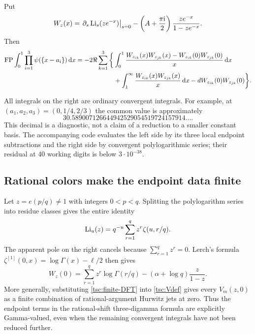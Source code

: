 \begin{corollary}\label{tsc:psi-mellin}
Put
\[
 W_z(x)=\left.\partial_s\operatorname{Li}_s(ze^{-x})\right|_{s=0}
            -\left(A+\frac{\pi\mathrm i}{2}\right)\frac{ze^{-x}}{1-ze^{-x}}.
\]
Then
\begin{align}\label{tsc:psi-integrals}
 \operatorname{FP}\int_0^1\prod_{i=1}^3\psi(\{x-a_i\})\,\mathrm d x
 =-2\Re\sum_{k=1}^3\bigg\{&
  \int_0^1\frac{W_{z_{ik}}(x)W_{z_{jk}}(x)
                 -W_{z_{ik}}(0)W_{z_{jk}}(0)}x\,\mathrm d x\notag\\
 &+\int_1^\infty\frac{W_{z_{ik}}(x)W_{z_{jk}}(x)}x\,\mathrm d x
   -dW_{z_{ik}}(0)W_{z_{jk}}(0)\bigg\}.
\end{align}
\end{corollary}
All integrals on the right are ordinary convergent integrals. For example,
at $(a_1,a_2,a_3)=(0,1/4,2/3)$ the common value is approximately
\[
 30.589007126644942529054519724157914\ldots.
\]
This decimal is a diagnostic, not a claim of a reduction to a smaller
constant basis. The accompanying code evaluates the left side by its
three local endpoint subtractions and the right side by convergent
polylogarithmic series; their residual at 40 working digits is below
$3\cdot10^{-38}$.

\subsection{Rational colors make the endpoint data finite}
Let $z=e(p/q)\ne1$ with integers $0<p<q$. Splitting the polylogarithm
series into residue classes gives the entire identity
\begin{equation}\label{tsc:finite-DFT}
 \operatorname{Li}_u(z)=q^{-u}\sum_{r=1}^q z^r\zeta(u,r/q).
\end{equation}
The apparent pole on the right cancels because $\sum_{r=1}^qz^r=0$.
Lerch's formula $\zeta^{[1]}(0,x)=\log\Gamma(x)-\ell/2$ then gives
\begin{equation}\label{tsc:W-boundary}
 W_z(0)=\sum_{r=1}^qz^r\log\Gamma(r/q)
       -(\alpha+\log q)\frac{z}{1-z}.
\end{equation}
More generally, substituting \eqref{tsc:finite-DFT} into \eqref{tsc:Vdef}
gives every $V_m(z,0)$ as a finite combination of rational-argument
Hurwitz jets at zero. Thus the endpoint terms in the rational-shift
three-digamma formula are explicitly Gamma-valued, even when the remaining
convergent integrals have not been reduced further.
